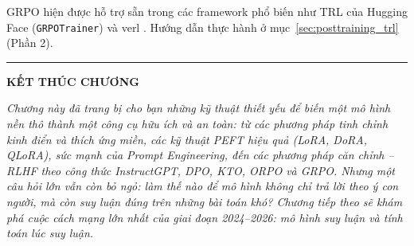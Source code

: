 GRPO hiện được hỗ trợ sẵn trong các framework phổ biến như TRL của Hugging Face (\texttt{GRPOTrainer}) và verl \cite{sheng2024hybridflow}. Hướng dẫn thực hành ở mục~\ref{sec:posttraining_trl} (Phần 2).

\bigskip
\hrule
\bigskip

\begin{center}
    \textbf{\Large KẾT THÚC CHƯƠNG \thechapter}
\end{center}

\textit{Chương này đã trang bị cho bạn những kỹ thuật thiết yếu để biến một mô hình nền thô thành một công cụ hữu ích và an toàn: từ các phương pháp tinh chỉnh kinh điển và thích ứng miền, các kỹ thuật PEFT hiệu quả (LoRA, DoRA, QLoRA), sức mạnh của Prompt Engineering, đến các phương pháp căn chỉnh -- RLHF theo công thức InstructGPT, DPO, KTO, ORPO và GRPO. Nhưng một câu hỏi lớn vẫn còn bỏ ngỏ: làm thế nào để mô hình không chỉ \emph{trả lời theo ý con người}, mà còn \emph{suy luận đúng} trên những bài toán khó? Chương tiếp theo sẽ khám phá cuộc cách mạng lớn nhất của giai đoạn 2024--2026: mô hình suy luận và tính toán lúc suy luận.}
